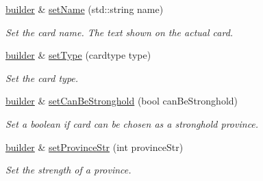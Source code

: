 \begin{DoxyCompactItemize}
\item 
\mbox{\label{classl5r_1_1CardData_1_1builder_aa3a1cc1bbbad5e3de87523f0cebb6fd7}} 
\hyperlink{classl5r_1_1CardData_1_1builder}{builder} \& \hyperlink{classl5r_1_1CardData_1_1builder_aa3a1cc1bbbad5e3de87523f0cebb6fd7}{set\+Name} (std\+::string name)
\begin{DoxyCompactList}\small\item\em Set the card name. The text shown on the actual card. \end{DoxyCompactList}\item 
\mbox{\label{classl5r_1_1CardData_1_1builder_a57323c1b6b7740bfa9e56b030e7093e7}} 
\hyperlink{classl5r_1_1CardData_1_1builder}{builder} \& \hyperlink{classl5r_1_1CardData_1_1builder_a57323c1b6b7740bfa9e56b030e7093e7}{set\+Type} (cardtype type)
\begin{DoxyCompactList}\small\item\em Set the card type. \end{DoxyCompactList}\item 
\mbox{\label{classl5r_1_1CardData_1_1builder_a6764f2eab36a6ddf86c838ede99378c0}} 
\hyperlink{classl5r_1_1CardData_1_1builder}{builder} \& \hyperlink{classl5r_1_1CardData_1_1builder_a6764f2eab36a6ddf86c838ede99378c0}{set\+Can\+Be\+Stronghold} (bool can\+Be\+Stronghold)
\begin{DoxyCompactList}\small\item\em Set a boolean if card can be chosen as a stronghold province. \end{DoxyCompactList}\item 
\mbox{\label{classl5r_1_1CardData_1_1builder_ad0298a521facf80e38e45e0ab0c9aa9f}} 
\hyperlink{classl5r_1_1CardData_1_1builder}{builder} \& \hyperlink{classl5r_1_1CardData_1_1builder_ad0298a521facf80e38e45e0ab0c9aa9f}{set\+Province\+Str} (int province\+Str)
\begin{DoxyCompactList}\small\item\em Set the strength of a province. \end{DoxyCompactList}\item 
\mbox{\label{classl5r_1_1CardData_1_1builder_a8f40ddc4707dd6ac13bc9c5354b6e980}} 

\end{DoxyCompactItemize}
